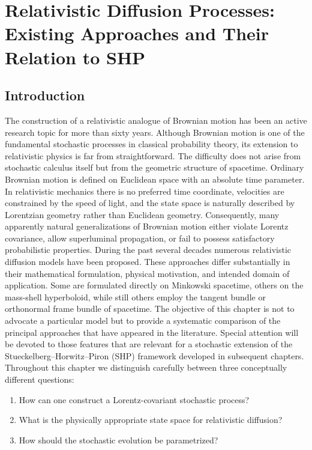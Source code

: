 \chapter{Relativistic Diffusion Processes:
Existing Approaches and Their Relation to SHP}
\label{ch:RelativisticDiffusions}
\section{Introduction}
The construction of a relativistic analogue of Brownian motion has been
an active research topic for more than sixty years. Although Brownian
motion is one of the fundamental stochastic processes in classical
probability theory, its extension to relativistic physics is far from
straightforward.
The difficulty does not arise from stochastic calculus itself but from
the geometric structure of spacetime. Ordinary Brownian motion is
defined on Euclidean space with an absolute time parameter. In
relativistic mechanics there is no preferred time coordinate, velocities
are constrained by the speed of light, and the state space is naturally
described by Lorentzian geometry rather than Euclidean geometry.
Consequently, many apparently natural generalizations of Brownian motion
either violate Lorentz covariance, allow superluminal propagation, or
fail to possess satisfactory probabilistic properties.
During the past several decades numerous relativistic diffusion models
have been proposed. These approaches differ substantially in their
mathematical formulation, physical motivation, and intended domain of
application. Some are formulated directly on Minkowski spacetime, others
on the mass-shell hyperboloid, while still others employ the tangent
bundle or orthonormal frame bundle of spacetime.
The objective of this chapter is not to advocate a particular model but
to provide a systematic comparison of the principal approaches that have
appeared in the literature. Special attention will be devoted to those
features that are relevant for a stochastic extension of the
Stueckelberg--Horwitz--Piron (SHP) framework developed in subsequent
chapters.
Throughout this chapter we distinguish carefully between three
conceptually different questions:
\begin{enumerate}
\item
How can one construct a Lorentz-covariant stochastic process?
\item
What is the physically appropriate state space for relativistic
diffusion?
\item
How should the stochastic evolution be parametrized?
\end{enumerate}
